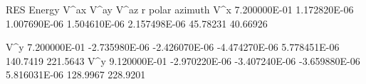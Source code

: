 RES     Energy          V^{ax}           V^{ay}            V^{az}          r               polar       azimuth
V^x     7.200000E-01    1.172820E-06     1.007690E-06      1.504610E-06    2.157498E-06    45.78231    40.66926
        
V^y     7.200000E-01    -2.735980E-06    -2.426070E-06    -4.474270E-06    5.778451E-06    140.7419    221.5643
V^y     9.120000E-01    -2.970220E-06    -3.407240E-06    -3.659880E-06    5.816031E-06    128.9967    228.9201
